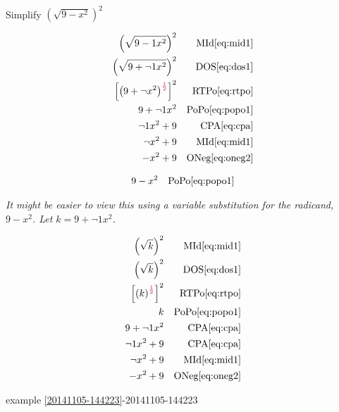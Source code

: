 \begin{example}[id:20141107-121834] \label{20141107-121834}  \hfill \\

Simplify $\left(\sqrt{9-x^2}\right)^2$

\soln

\solnsteps
\begin{align*}
\left(\sqrt{9-1x^2}\right)^2 && \text{MId} \eqref{eq:mid1} \\
\left(\sqrt{9+\neg 1x^2}\right)^2 && \text{DOS} \eqref{eq:dos1} \\
\left[\left(9+\neg x^2\right)^{\alert{\frac{1}{2}}} \right]^2 && \text{RTPo} \eqref{eq:rtpo} \\
9+\neg 1 x^2 && \text{PoPo} \eqref{eq:popo1} \\
\neg 1 x^2 + 9 && \text{CPA} \eqref{eq:cpa} \\
\neg x^2 + 9 && \text{MId} \eqref{eq:mid1} \\
-x^2+9 && \text{ONeg} \eqref{eq:oneg2} 
\end{align*}

\soln

\lesssteps
\begin{align*}
9-x^2 && \text{PoPo} \eqref{eq:popo1} 
\end{align*}


\emph{It might be easier to view this using a variable substitution for the radicand, $9-x^2$. Let $k=9+\neg 1x^2$.}

\begin{align*}
\left(\sqrt{k}\right)^2 && \text{MId} \eqref{eq:mid1} \\
\left(\sqrt{k}\right)^2 && \text{DOS} \eqref{eq:dos1} \\
\left[\left(k\right)^{\alert{\frac{1}{2}}} \right]^2 && \text{RTPo} \eqref{eq:rtpo} \\
k && \text{PoPo} \eqref{eq:popo1} \\
9 + \neg 1 x^2  && \text{CPA} \eqref{eq:cpa} \\
\neg 1 x^2 + 9 && \text{CPA} \eqref{eq:cpa} \\
\neg x^2 + 9 && \text{MId} \eqref{eq:mid1} \\
-x^2+9 && \text{ONeg} \eqref{eq:oneg2} 
\end{align*}

\qdepend 

\qdependlist
example \ref{20141105-144223}-20141105-144223


\end{example}

